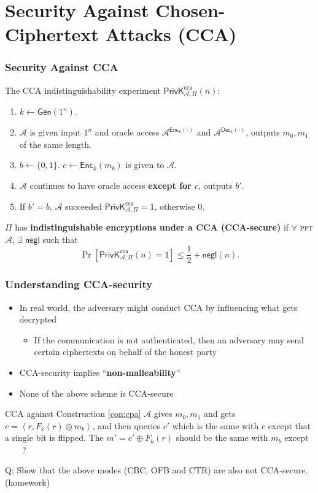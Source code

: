 \section{Security Against Chosen-Ciphertext Attacks (CCA)}
\begin{frame}\frametitle{Security Against CCA}
The CCA indistinguishability experiment $\mathsf{PrivK}^{\mathsf{cca}}_{\mathcal{A},\Pi}(n)$:
\begin{enumerate}
	\item $k \gets \mathsf{Gen}(1^n)$.
	\item $\mathcal{A}$ is given input $1^n$ and oracle access $\mathcal{A}^{\mathsf{Enc}_k(\cdot)}$ and $\mathcal{A}^{\mathsf{Dec}_k(\cdot)}$, outputs $m_0, m_1$ of the same length.
	\item $b \gets \{0,1\}$. $c \gets \mathsf{Enc}_k(m_b)$ is given to $\mathcal{A}$.
	\item $\mathcal{A}$ continues to have oracle access \alert{\textbf{except for $c$}}, outputs $b'$.
	\item If $b' = b$, $\mathcal{A}$ succeeded $\mathsf{PrivK}^{\mathsf{cca}}_{\mathcal{A},\Pi}=1$, otherwise 0.
\end{enumerate}
\begin{definition}
$\Pi$ has \textbf{indistinguishable encryptions under a CCA (CCA-secure)} if $\forall$ \textsc{ppt} $\mathcal{A}$, $\exists$ $\mathsf{negl}$ such that
\[ \Pr\left[\mathsf{PrivK}^{\mathsf{cca}}_{\mathcal{A},\Pi}(n)=1\right] \le \frac{1}{2} + \mathsf{negl}(n).
\]
\end{definition}
\end{frame}
\begin{frame}\frametitle{Understanding CCA-security}
\begin{itemize}
\item In real world, the adversary might conduct CCA by influencing what gets decrypted
\begin{itemize}
\item If the communication is not authenticated, then an adversary may send certain ciphertexts on behalf of the honest party
\end{itemize}
\item CCA-security implies ``\textbf{non-malleability}''
\item None of the above scheme is CCA-secure
\end{itemize}
\begin{exampleblock}{CCA against Construction \ref{con:cpa}}
$\mathcal{A}$ gives $m_{0}, m_{1}$ and gets $c = \left<r, F_k(r)\oplus m_{b}\right>$, 
and then queries $c'$ which is the same with $c$ except that a single bit is flipped. 
The $m' = c' \oplus F_k(r)$ should be the same with $m_{b}$ \alert{except \underline{$\qquad$}?}
\end{exampleblock}
\alert{Q: Show that the above modes (CBC, OFB and CTR) are also not CCA-secure. (homework)}
\end{frame}
